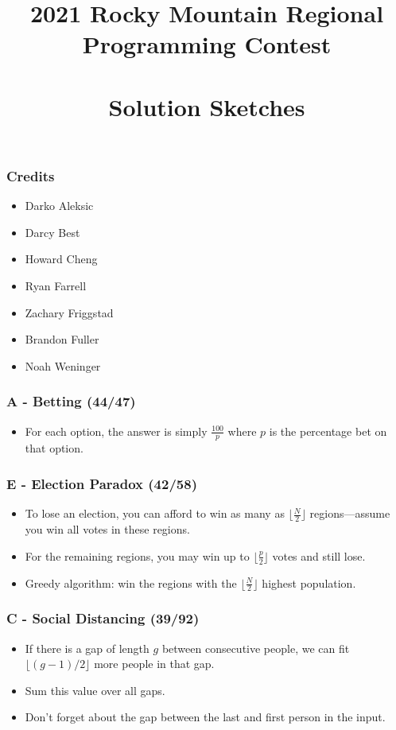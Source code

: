 \documentclass{beamer}
\title[RMRC 2021 Solution Sketches]
{2021 Rocky Mountain Regional \\ Programming Contest \\ \ \\ Solution Sketches}
\date
{}
\begin{document}
\begin{frame}
\titlepage
\end{frame}
\begin{frame}
\frametitle{Credits}
\begin{itemize}
  \setlength\itemsep{0.5\baselineskip}
\item Darko Aleksic
\item Darcy Best
\item Howard Cheng
\item Ryan Farrell
\item Zachary Friggstad
\item Brandon Fuller
\item Noah Weninger
\end{itemize}
\end{frame}


\begin{frame}
\frametitle{A - Betting (44/47)}
\begin{itemize}
\setlength\itemsep{0.5\baselineskip}
\item For each option, the answer is simply $\frac{100}{p}$ where $p$ is
  the percentage bet on that option.
\end{itemize}
\end{frame}


\begin{frame}
\frametitle{E - Election Paradox (42/58)}
\begin{itemize}
\setlength\itemsep{0.5\baselineskip}
\item To lose an election, you can afford to win as many as
  $\lfloor \frac{N}{2} \rfloor$ regions---assume you win all votes in
  these regions.
\item For the remaining regions, you may win up to
  $\lfloor \frac{p}{2} \rfloor$ votes and still lose.
\item Greedy algorithm: win the regions with the $\lfloor \frac{N}{2} \rfloor$
  highest population.
\end{itemize}
\end{frame}


\begin{frame}
\frametitle{C - Social Distancing (39/92)}
\begin{itemize}
  \setlength\itemsep{0.5\baselineskip}
  \item If there is a gap of length $g$ between consecutive people, we can fit $\lfloor (g-1)/2\rfloor$ more people in that gap.
  \item Sum this value over all gaps.
  \item Don't forget about the gap between the last and first person in the input.
\end{itemize}
\end{frame}
\end{document}
